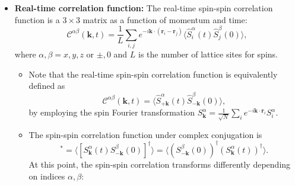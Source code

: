 \documentclass[aps, prx, nofootinbib, superscriptaddress]{revtex4-2}
\begin{document}
\begin{itemize}
    \item \textbf{Real-time correlation function:}
    The real-time spin-spin correlation function is a $3 \times 3$ matrix as a function of momentum and time:
    \begin{equation}
        \mathcal{C}^{\alpha\beta} (\mathbf{k}, t) = \frac{1}{L} \sum_{i, j} e^{- i \mathbf{k} \cdot (\mathbf{r}_{i} - \mathbf{r}_{j})} \langle \hat{S}_{i}^{\alpha}(t) \hat{S}_{j}^{\beta}(0) \rangle,
    \end{equation}
    where $\alpha, \beta = x, y, z$ or $\pm, 0$ and $L$ is the number of lattice sites for spins. 

    \begin{itemize}
        \item Note that the real-time spin-spin correlation function is equivalently defined as 
        \begin{equation}
            \mathcal{C}^{\alpha\beta} (\mathbf{k}, t) 
            = \big\langle \hat{S}_{+ \mathbf{k}}^{\alpha}(t) \hat{S}_{- \mathbf{k}}^{\beta}(0) \big\rangle,  
        \end{equation}
        by employing the spin Fourier transformation $S_{\mathbf{k}}^{\alpha} = \frac{1}{\sqrt{N}} \sum_{i} e^{-i \mathbf{k} \cdot \mathbf{r}_{i}} S_{i}^{\alpha}$.
        
        \item The spin-spin correlation function under complex conjugation is 
        \begin{equation}
            [\mathcal{C}^{\alpha\beta}(\mathbf{k}, t)]^{*}
            = \langle [S_{\mathbf{k}}^{\alpha} ( t ) S_{-\mathbf{k}}^{\beta} ( 0 )]^{\dagger} \rangle
            = \langle (S_{-\mathbf{k}}^{\beta} ( 0 ))^{\dagger} (S_{\mathbf{k}}^{\alpha} ( t ))^{\dagger} \rangle.
        \end{equation}
        At this point, the spin-spin correlation transforms differently depending on indices $\alpha, \beta$:
        

\end{itemize}
\end{itemize}
\end{document}

